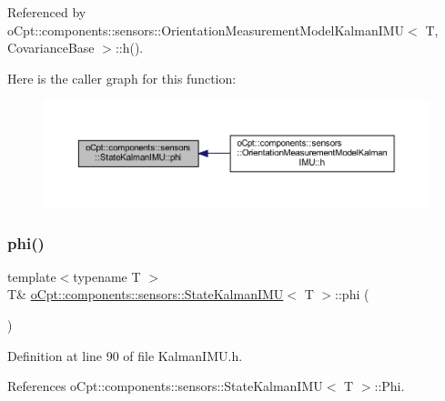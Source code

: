 Referenced by o\+Cpt\+::components\+::sensors\+::\+Orientation\+Measurement\+Model\+Kalman\+I\+M\+U$<$ T, Covariance\+Base $>$\+::h().

Here is the caller graph for this function\+:
\nopagebreak
\begin{figure}[H]
\begin{center}
\leavevmode
\includegraphics[width=350pt]{classo_cpt_1_1components_1_1sensors_1_1_state_kalman_i_m_u_abdcc72fa4577d598c0dfa587e3fd5c50_icgraph}
\end{center}
\end{figure}
\hypertarget{classo_cpt_1_1components_1_1sensors_1_1_state_kalman_i_m_u_afb684e2c82297c65dc2566a1503ca496}{}\label{classo_cpt_1_1components_1_1sensors_1_1_state_kalman_i_m_u_afb684e2c82297c65dc2566a1503ca496} 
\subsubsection{\texorpdfstring{phi()}{phi()}\hspace{0.1cm}{\footnotesize\ttfamily [2/2]}}
{\footnotesize\ttfamily template$<$typename T $>$ \\
T\& \hyperlink{classo_cpt_1_1components_1_1sensors_1_1_state_kalman_i_m_u}{o\+Cpt\+::components\+::sensors\+::\+State\+Kalman\+I\+MU}$<$ T $>$\+::phi (\begin{DoxyParamCaption}{ }\end{DoxyParamCaption})\hspace{0.3cm}{\ttfamily [inline]}}



Definition at line 90 of file Kalman\+I\+M\+U.\+h.



References o\+Cpt\+::components\+::sensors\+::\+State\+Kalman\+I\+M\+U$<$ T $>$\+::\+Phi.

\hypertarget{classo_cpt_1_1components_1_1sensors_1_1_state_kalman_i_m_u_ac98769f4896ac5b4f82e7cbf5ec153b4}{}\label{classo_cpt_1_1components_1_1sensors_1_1_state_kalman_i_m_u_ac98769f4896ac5b4f82e7cbf5ec153b4} 
